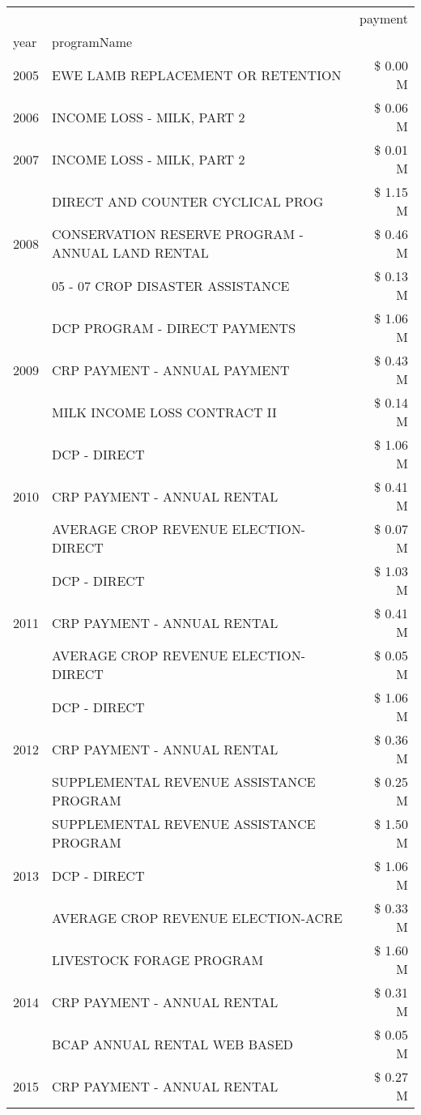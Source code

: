 \begin{tabular}{llr}
\toprule
 &  & payment \\
year & programName &  \\
\midrule
2005 & EWE LAMB REPLACEMENT OR RETENTION & \$ 0.00 M \\
\cline{1-3}
2006 & INCOME LOSS - MILK, PART 2 & \$ 0.06 M \\
\cline{1-3}
2007 & INCOME LOSS - MILK, PART 2 & \$ 0.01 M \\
\cline{1-3}
\multirow[t]{3}{*}{2008} & DIRECT AND COUNTER CYCLICAL PROG & \$ 1.15 M \\
 & CONSERVATION RESERVE PROGRAM - ANNUAL LAND RENTAL & \$ 0.46 M \\
 & 05 - 07 CROP DISASTER ASSISTANCE & \$ 0.13 M \\
\cline{1-3}
\multirow[t]{3}{*}{2009} & DCP PROGRAM - DIRECT PAYMENTS & \$ 1.06 M \\
 & CRP PAYMENT - ANNUAL PAYMENT & \$ 0.43 M \\
 & MILK INCOME LOSS CONTRACT II & \$ 0.14 M \\
\cline{1-3}
\multirow[t]{3}{*}{2010} & DCP - DIRECT & \$ 1.06 M \\
 & CRP PAYMENT - ANNUAL RENTAL & \$ 0.41 M \\
 & AVERAGE CROP REVENUE ELECTION-DIRECT & \$ 0.07 M \\
\cline{1-3}
\multirow[t]{3}{*}{2011} & DCP - DIRECT & \$ 1.03 M \\
 & CRP PAYMENT - ANNUAL RENTAL & \$ 0.41 M \\
 & AVERAGE CROP REVENUE ELECTION-DIRECT & \$ 0.05 M \\
\cline{1-3}
\multirow[t]{3}{*}{2012} & DCP - DIRECT & \$ 1.06 M \\
 & CRP PAYMENT - ANNUAL RENTAL & \$ 0.36 M \\
 & SUPPLEMENTAL REVENUE ASSISTANCE PROGRAM & \$ 0.25 M \\
\cline{1-3}
\multirow[t]{3}{*}{2013} & SUPPLEMENTAL REVENUE ASSISTANCE PROGRAM & \$ 1.50 M \\
 & DCP - DIRECT & \$ 1.06 M \\
 & AVERAGE CROP REVENUE ELECTION-ACRE & \$ 0.33 M \\
\cline{1-3}
\multirow[t]{3}{*}{2014} & LIVESTOCK FORAGE PROGRAM & \$ 1.60 M \\
 & CRP PAYMENT - ANNUAL RENTAL & \$ 0.31 M \\
 & BCAP ANNUAL RENTAL WEB BASED & \$ 0.05 M \\
\cline{1-3}
\multirow[t]{3}{*}{2015} & CRP PAYMENT - ANNUAL RENTAL & \$ 0.27 M \\

\end{tabular}
